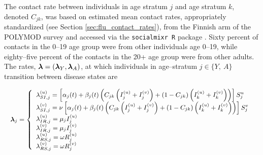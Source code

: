 The contact rate between individuals in age stratum $ j $ and age stratum $ k $, denoted $ C_{jk} $, was based on estimated mean contact rates, appropriately standardized (see Section \ref{sec:flu_contact_rates}), from the Finnish arm of the POLYMOD survey \cite{mossong2008social,polymod} and accessed via the \texttt{socialmixr R} package \cite{funk2018socialmixr}. Sixty percent of contacts in the 0--19 age group were from other individuals age 0--19, while eighty--five percent of the contacts in the 20+ age group were from other adults. The rates, $ \boldsymbol{\lambda} = (\boldsymbol{\lambda}_{Y},\boldsymbol{\lambda}_{A}) $, at which individuals in age--stratum $ j \in \lbrace Y,\ A\rbrace $ transition between disease states are

\begin{equation}\small
\label{eqn:flu_sirs_rates}
\boldsymbol{\lambda}_{j} = \left\lbrace
\begin{array}{ll}
\lambda_{SI,j}^{(u)} = \left [\alpha_{j}(t) + \beta_{j}(t)\left (C_{jk}\left (I_{j}^{(u)} + I_{j}^{(v)}\right ) + (1-C_{jk})\left (I_{k}^{(u)} + I_{k}^{(v)}\right )\right )\right ]S_{j}^{u} \\ 
\lambda_{SI,j}^{(v)} = \nu\left [\alpha_{j}(t) + \beta_{j}(t)\left (C_{jk}\left (I_{j}^{(u)} + I_{j}^{(v)}\right ) + (1-C_{jk})\left (I_{k}^{(u)} + I_{k}^{(v)}\right )\right )\right ]S_{j}^{v}\\
\lambda_{IR,j}^{(u)} = \mu_{j} I_{j}^{(u)} \\
\lambda_{IR,j}^{(v)} = \mu_{j} I_{j}^{(v)} \\
\lambda_{RS,j}^{(u)} = \omega R_{j}^{(u)} \\
\lambda_{RS,j}^{(v)} = \omega R_{j}^{(v)}
\end{array}
\right .
\end{equation}

